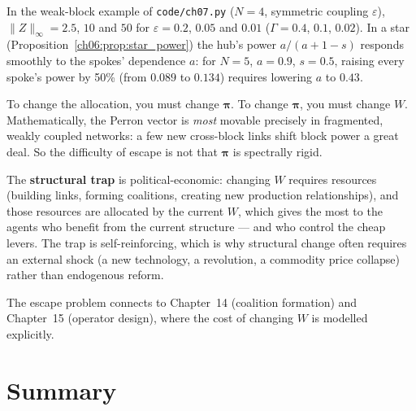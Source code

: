 \documentclass[../structural_economics_book.tex]{subfiles}
\begin{document}
In the weak-block example of \texttt{code/ch07.py} ($N = 4$, symmetric coupling $\varepsilon$), $\|Z\|_\infty = 2.5$, $10$ and $50$ for $\varepsilon = 0.2$, $0.05$ and $0.01$ ($\Gamma = 0.4$, $0.1$, $0.02$). In a star (Proposition~\ref{ch06:prop:star_power}) the hub's power $a/(a+1-s)$ responds smoothly to the spokes' dependence $a$: for $N = 5$, $a = 0.9$, $s = 0.5$, raising every spoke's power by 50\% (from $0.089$ to $0.134$) requires lowering $a$ to $0.43$.

\begin{intuition}
To change the allocation, you must change $\boldsymbol{\pi}$. To change $\boldsymbol{\pi}$, you must change $W$. Mathematically, the Perron vector is \textit{most} movable precisely in fragmented, weakly coupled networks: a few new cross-block links shift block power a great deal. So the difficulty of escape is not that $\boldsymbol{\pi}$ is spectrally rigid.

The \textbf{structural trap} is political-economic: changing $W$ requires resources (building links, forming coalitions, creating new production relationships), and those resources are allocated by the current $W$, which gives the most to the agents who benefit from the current structure --- and who control the cheap levers. The trap is self-reinforcing, which is why structural change often requires an external shock (a new technology, a revolution, a commodity price collapse) rather than endogenous reform.
\end{intuition}

The escape problem connects to Chapter~14 (coalition formation) and Chapter~15 (operator design), where the cost of changing $W$ is modelled explicitly.


\section{Summary}
\label{ch07:sec:summary}
\end{document}
